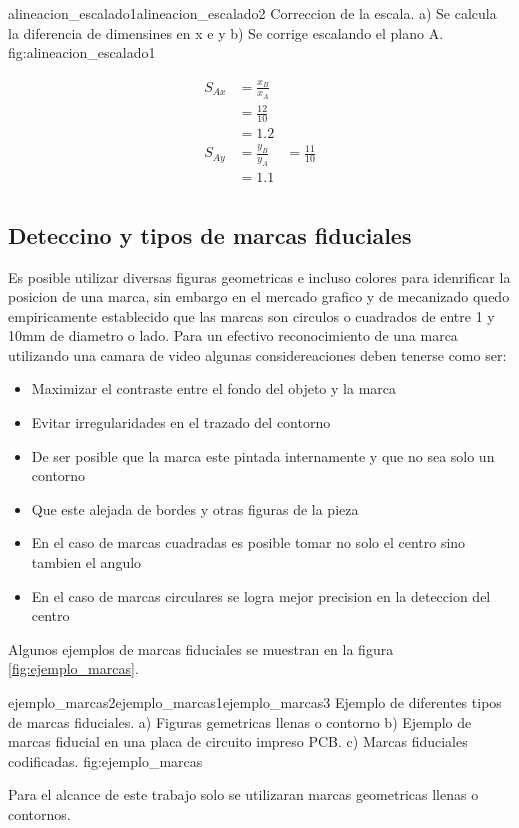          {alineacion_escalado1}{alineacion_escalado2}
         {Correccion de la escala. a) Se calcula la diferencia de dimensines en x e y b) Se corrige escalando el plano A.}
         {fig:alineacion_escalado1}

         \begin{equation}
            \begin{aligned}
               S_{Ax} &= \frac{x_B}{x_A}\\
                      &= \frac{12}{10}\\
                      &= 1.2\\
               S_{Ay} &= \frac{y_B}{y_A}
                      &= \frac{11}{10}\\
                      &= 1.1\\
            \end{aligned}
            \label{eq:alineacion_escalado}
         \end{equation}


\subsection{Deteccino y tipos de marcas fiduciales}
   Es posible utilizar diversas figuras geometricas e incluso colores para idenrificar la posicion de una marca, sin embargo en el mercado grafico y de mecanizado quedo empiricamente establecido que las marcas son circulos o cuadrados de entre 1 y 10mm de diametro o lado.
   Para un efectivo reconocimiento de una marca utilizando una camara de video algunas considereaciones deben tenerse como ser:
   \begin{itemize}
      \item{Maximizar el contraste entre el fondo del objeto y la marca}
      \item{Evitar irregularidades en el trazado del contorno}
      \item{De ser posible que la marca este pintada internamente y que no sea solo un contorno}
      \item{Que este alejada de bordes y otras figuras de la pieza}
      \item{En el caso de marcas cuadradas es posible tomar no solo el centro sino tambien el angulo}
      \item{En el caso de marcas circulares se logra mejor precision en la deteccion del centro}
   \end{itemize}
   Algunos ejemplos de marcas fiduciales se muestran en la figura \ref{fig:ejemplo_marcas}.

         {ejemplo_marcas2}{ejemplo_marcas1}{ejemplo_marcas3}
         {Ejemplo de diferentes tipos de marcas fiduciales. a) Figuras gemetricas llenas o contorno b) Ejemplo de marcas fiducial en una placa de circuito impreso PCB. c) Marcas fiduciales codificadas.}
         {fig:ejemplo_marcas}

         Para el alcance de este trabajo solo se utilizaran marcas geometricas llenas o contornos.



   

